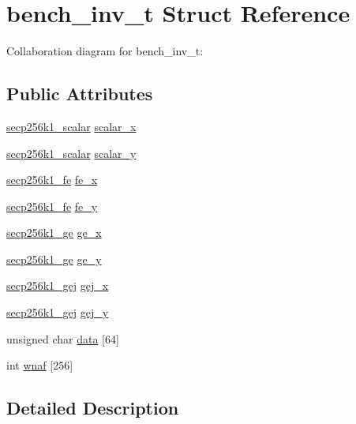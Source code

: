 \hypertarget{structbench__inv__t}{}\section{bench\+\_\+inv\+\_\+t Struct Reference}
\label{structbench__inv__t}


Collaboration diagram for bench\+\_\+inv\+\_\+t\+:
\subsection*{Public Attributes}
\begin{DoxyCompactItemize}
\item 
\hyperlink{structsecp256k1__scalar}{secp256k1\+\_\+scalar} \hyperlink{structbench__inv__t_afbceac71719c71325b7ad1b126b73734}{scalar\+\_\+x}
\item 
\hyperlink{structsecp256k1__scalar}{secp256k1\+\_\+scalar} \hyperlink{structbench__inv__t_a87f434ca8cb31f90f37dab4099e78822}{scalar\+\_\+y}
\item 
\hyperlink{structsecp256k1__fe}{secp256k1\+\_\+fe} \hyperlink{structbench__inv__t_a295aac5b6fa7c667c2869472e2512a4b}{fe\+\_\+x}
\item 
\hyperlink{structsecp256k1__fe}{secp256k1\+\_\+fe} \hyperlink{structbench__inv__t_af075523af15e7d92c74dd0748e8227af}{fe\+\_\+y}
\item 
\hyperlink{structsecp256k1__ge}{secp256k1\+\_\+ge} \hyperlink{structbench__inv__t_a61098b92fed00ae0f9f28707a9651f1d}{ge\+\_\+x}
\item 
\hyperlink{structsecp256k1__ge}{secp256k1\+\_\+ge} \hyperlink{structbench__inv__t_a0ff79efc25c6a6157bfe32eb51e231a3}{ge\+\_\+y}
\item 
\hyperlink{structsecp256k1__gej}{secp256k1\+\_\+gej} \hyperlink{structbench__inv__t_ad800b15a5597e319593b9b5dc216c3e7}{gej\+\_\+x}
\item 
\hyperlink{structsecp256k1__gej}{secp256k1\+\_\+gej} \hyperlink{structbench__inv__t_a3723df1adf93d090562d8e3c1cf9a6c1}{gej\+\_\+y}
\item 
unsigned char \hyperlink{structbench__inv__t_a56475198397964faa420c67fb2af4c7c}{data} \mbox{[}64\mbox{]}
\item 
int \hyperlink{structbench__inv__t_ad3f27ccce40e43c4d9efd6942b911de1}{wnaf} \mbox{[}256\mbox{]}
\end{DoxyCompactItemize}


\subsection{Detailed Description}


